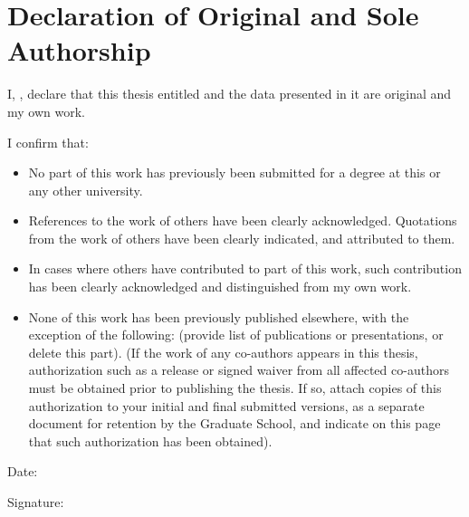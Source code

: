 \chapter*{Declaration of Original and Sole Authorship}

I, \name, declare that this thesis entitled \emph{\thesistitle} and the data presented in it are original and my own work.


I confirm that:
\begin{itemize}
    \item No part of this work has previously been submitted for a degree at this or any other university.
    \item References to the work of others have been clearly acknowledged. Quotations from the work of others have been clearly indicated, and attributed to them.
    \item In cases where others have contributed to part of this work, such contribution has been clearly acknowledged and distinguished from my own work.
    \item None of this work has been previously published elsewhere, with the exception of the following: (provide list of publications or presentations, or delete this part).  (If the work of any co-authors appears in this thesis, authorization such as a release or signed waiver from all affected co-authors must be obtained prior to publishing the thesis.  If so, attach copies of this authorization to your initial and final submitted versions, as a separate document for retention by the Graduate School, and indicate on this page that such authorization has been obtained).
\end{itemize}

Date:  \submissiondate

Signature:
